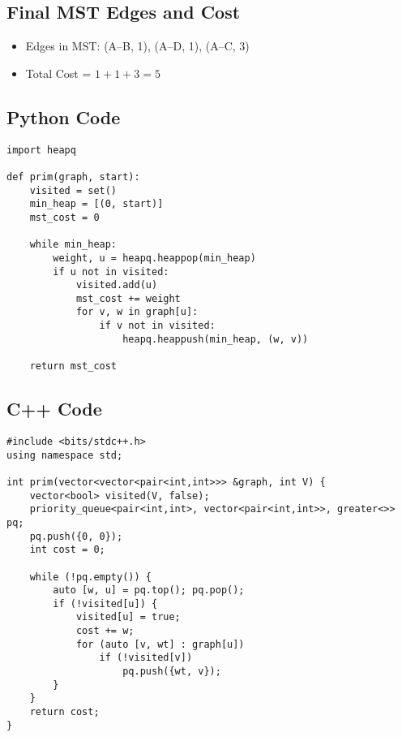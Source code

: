 \documentclass[a4paper,14pt]{extarticle}
\begin{document}
\subsection*{Final MST Edges and Cost}

\begin{itemize}
    \item Edges in MST: (A–B, 1), (A–D, 1), (A–C, 3)
    \item Total Cost = $1 + 1 + 3 = 5$
\end{itemize}

\newpage
\subsection{Python Code}
\begin{lstlisting}[style=python, caption={Prim's Algorithm in Python}]
import heapq

def prim(graph, start):
    visited = set()
    min_heap = [(0, start)]
    mst_cost = 0

    while min_heap:
        weight, u = heapq.heappop(min_heap)
        if u not in visited:
            visited.add(u)
            mst_cost += weight
            for v, w in graph[u]:
                if v not in visited:
                    heapq.heappush(min_heap, (w, v))

    return mst_cost
\end{lstlisting}

\subsection{C++ Code}
\begin{lstlisting}[style=cpp, caption={Prim's Algorithm in C++}]
#include <bits/stdc++.h>
using namespace std;

int prim(vector<vector<pair<int,int>>> &graph, int V) {
    vector<bool> visited(V, false);
    priority_queue<pair<int,int>, vector<pair<int,int>>, greater<>> pq;
    pq.push({0, 0});
    int cost = 0;

    while (!pq.empty()) {
        auto [w, u] = pq.top(); pq.pop();
        if (!visited[u]) {
            visited[u] = true;
            cost += w;
            for (auto [v, wt] : graph[u])
                if (!visited[v])
                    pq.push({wt, v});
        }
    }
    return cost;
}
\end{lstlisting}

\end{document}

